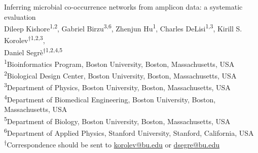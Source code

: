 \documentclass[letterpaper,12pt]{article}
\begin{document}


\begin{titlepage}

  \newcommand{\HRule}{\rule{\linewidth}{0.5mm}} %

  \center %





  \vspace*{\fill}
  {\huge Inferring microbial co-occurrence networks from amplicon data: a systematic evaluation}\\[0.4cm]


  \vspace{1.5 cm}
  Dileep Kishore\textsuperscript{1,2},
  Gabriel Birzu\textsuperscript{3,6},
  Zhenjun Hu\textsuperscript{1},
  Charles DeLisi\textsuperscript{1,3},
  Kirill S. Korolev\textsuperscript{$\dagger$1,2,3},\\
  Daniel Segr\`{e}\textsuperscript{$\dagger$1,2,4,5}\\
  \vspace{1cm}
  \textsuperscript{1}Bioinformatics Program, Boston University, Boston, Massachusetts, USA\\
  \textsuperscript{2}Biological Design Center, Boston University, Boston, Massachusetts, USA\\
  \textsuperscript{3}Department of Physics, Boston University, Boston, Massachusetts, USA\\
  \textsuperscript{4}Department of Biomedical Engineering, Boston University, Boston, Massachusetts, USA\\
  \textsuperscript{5}Department of Biology, Boston University, Boston, Massachusetts, USA\\
  \textsuperscript{6}Department of Applied Physics, Stanford University, Stanford, California, USA\\
  \textsuperscript{$\dagger$}Correspondence should be sent to \href{mailto:korolev@bu.edu}{korolev@bu.edu} or \href{mailto:dsegre@bu.edu}{dsegre@bu.edu}\\


\end{titlepage}
\end{document}
